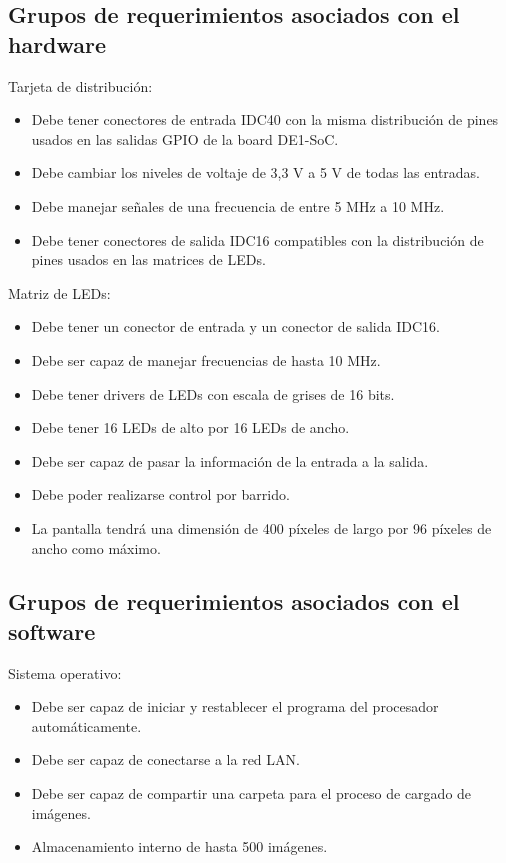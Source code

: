 \subsection{Grupos de requerimientos asociados con el hardware}

Tarjeta de distribución:
\begin{itemize}
\item Debe tener conectores de entrada IDC40 con la misma distribución de pines usados en las salidas GPIO de la board DE1-SoC.
\item Debe cambiar los niveles de voltaje de 3,3 V a 5 V de todas las entradas. 
\item Debe manejar señales de una frecuencia de entre 5 MHz a 10 MHz.
\item Debe tener conectores de salida IDC16 compatibles con la distribución de pines usados en las matrices de LEDs.
\end{itemize}
Matriz de LEDs:
\begin{itemize}
\item Debe tener un conector de entrada y un conector de salida IDC16.
\item Debe ser capaz de manejar frecuencias de hasta 10 MHz.
\item Debe tener drivers de LEDs con escala de grises de 16 bits.
\item Debe tener 16 LEDs de alto por 16 LEDs de ancho.
\item Debe ser capaz de pasar la información de la entrada a la salida.
\item Debe poder realizarse control por barrido. 
\item La pantalla tendrá una dimensión de 400 píxeles de largo por 96 píxeles de ancho como máximo.
\end{itemize}

\subsection{Grupos de requerimientos asociados con el software}

Sistema operativo:
\begin{itemize}
\item Debe ser capaz de iniciar y restablecer el programa del procesador automáticamente.
\item Debe ser capaz de conectarse a la red LAN. 
\item Debe ser capaz de compartir una carpeta para el proceso de cargado de imágenes.
\item Almacenamiento interno de hasta 500 imágenes.
\end{itemize}

